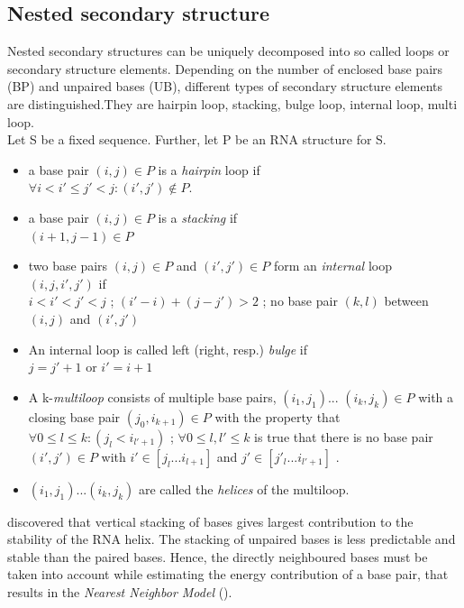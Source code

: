 \documentclass[twoside,a4paper]{report}
\begin{document}
	\subsection{Nested secondary structure}
	Nested secondary structures can be uniquely decomposed into so called loops or secondary structure elements. Depending on the number of enclosed base pairs (BP) and unpaired bases (UB), different types of secondary structure elements are distinguished.They are hairpin loop, stacking, bulge loop, internal loop, multi loop. \\
	Let S be a fixed sequence. Further, let P be an RNA structure for S.
	\begin{itemize}
		\item a base pair $( i, j ) \in P$ is a \textit{hairpin} loop if\\
			$	\forall i < i' \leq j' < j : (i', j') \notin P. $

		\item a base pair $( i, j ) \in P$ is a \textit{stacking} if\\
		$(i + 1 , j - 1 ) \in P $
		\item two base pairs $ (i, j) \in P$ and $(i' ,j' ) \in P$ form  an \textit{internal} loop $(i,j,i',j')$ if \\
		$i < i' < j' < j $ ; $ (i' - i)+( j - j') > 2$ ; no base pair $(k,l)$ between $(i, j)$ and $(i',j')$
		\item An internal loop is called left (right, resp.) \textit{bulge} if\\
		$ j = j' +1 $ or $ i' = i+1$
		\item A k-\textit{multiloop} consists of multiple base pairs, $(i_1,j_1)$... $(i_k,j_k) \in P$ with a closing base pair $(j_0, i_{k+1}) \in P$ with the property that \\
		$\forall 0 \leq l \leq k : ( j_l < i_{l'+1})$ ; $\forall 0 \leq l , l' \leq k$ is true that there is no base pair $(i' ,j') \in P$ with $i' \in [j_l...i_{l+1}]$ and $j' \in [j'_l...i_{l'+1}]$ .
		\item $(i_1,j_1)...(i_k, j_k)$ are called the \textit{helices} of the multiloop.\\
 	\end{itemize}
 
 
 	 \citep{DeVoe1962TheSO} discovered that vertical stacking of bases gives largest contribution to the stability of the RNA helix. The stacking of unpaired bases is less predictable and stable than the paired bases. Hence, the directly neighboured bases must be taken into account while estimating the energy contribution of a  base pair, that results in the \textit{Nearest Neighbor Model} (\citep{borer1974stability}).\\
 	 
\end{document}
